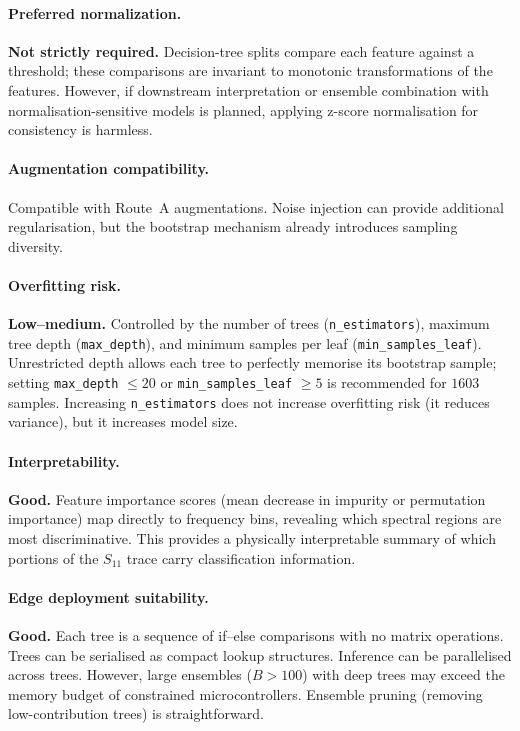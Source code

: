 \paragraph{Preferred normalization.}
\textbf{Not strictly required.}  Decision-tree splits compare each
feature against a threshold; these comparisons are invariant to
monotonic transformations of the features.  However, if downstream
interpretation or ensemble combination with normalisation-sensitive
models is planned, applying z-score normalisation for consistency is
harmless.

\paragraph{Augmentation compatibility.}
Compatible with Route~A augmentations.  Noise injection can provide
additional regularisation, but the bootstrap mechanism already
introduces sampling diversity.

\paragraph{Overfitting risk.}
\textbf{Low--medium.}  Controlled by the number of trees
(\texttt{n\_estimators}), maximum tree depth (\texttt{max\_depth}),
and minimum samples per leaf (\texttt{min\_samples\_leaf}).
Unrestricted depth allows each tree to perfectly memorise its bootstrap
sample; setting \texttt{max\_depth} $\leq 20$ or
\texttt{min\_samples\_leaf} $\geq 5$ is recommended for $\num{1603}$
samples.  Increasing \texttt{n\_estimators} does not increase
overfitting risk (it reduces variance), but it increases model size.

\paragraph{Interpretability.}
\textbf{Good.}  Feature importance scores (mean decrease in impurity
or permutation importance) map directly to frequency bins, revealing
which spectral regions are most discriminative.  This provides a
physically interpretable summary of which portions of the $S_{11}$
trace carry classification information.

\paragraph{Edge deployment suitability.}
\textbf{Good.}  Each tree is a sequence of if--else comparisons with
no matrix operations.  Trees can be serialised as compact lookup
structures.  Inference can be parallelised across trees.  However,
large ensembles ($B > 100$) with deep trees may exceed the memory
budget of constrained microcontrollers.  Ensemble pruning (removing
low-contribution trees) is straightforward.

